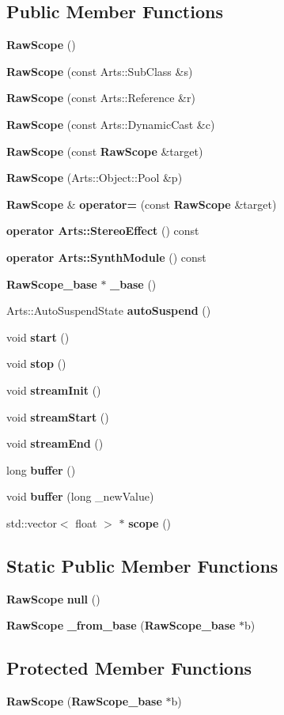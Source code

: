 \subsection*{Public Member Functions}
\begin{CompactItemize}
\item 
{\bf Raw\-Scope} ()
\item 
{\bf Raw\-Scope} (const Arts::Sub\-Class \&s)
\item 
{\bf Raw\-Scope} (const Arts::Reference \&r)
\item 
{\bf Raw\-Scope} (const Arts::Dynamic\-Cast \&c)
\item 
{\bf Raw\-Scope} (const {\bf Raw\-Scope} \&target)
\item 
{\bf Raw\-Scope} (Arts::Object::Pool \&p)
\item 
{\bf Raw\-Scope} \& {\bf operator=} (const {\bf Raw\-Scope} \&target)
\item 
{\bf operator Arts::Stereo\-Effect} () const 
\item 
{\bf operator Arts::Synth\-Module} () const 
\item 
{\bf Raw\-Scope\_\-base} $\ast$ {\bf \_\-base} ()
\item 
Arts::Auto\-Suspend\-State {\bf auto\-Suspend} ()
\item 
void {\bf start} ()
\item 
void {\bf stop} ()
\item 
void {\bf stream\-Init} ()
\item 
void {\bf stream\-Start} ()
\item 
void {\bf stream\-End} ()
\item 
long {\bf buffer} ()
\item 
void {\bf buffer} (long \_\-new\-Value)
\item 
std::vector$<$ float $>$ $\ast$ {\bf scope} ()
\end{CompactItemize}
\subsection*{Static Public Member Functions}
\begin{CompactItemize}
\item 
{\bf Raw\-Scope} {\bf null} ()
\item 
{\bf Raw\-Scope} {\bf \_\-from\_\-base} ({\bf Raw\-Scope\_\-base} $\ast$b)
\end{CompactItemize}
\subsection*{Protected Member Functions}
\begin{CompactItemize}
\item 
{\bf Raw\-Scope} ({\bf Raw\-Scope\_\-base} $\ast$b)
\end{CompactItemize}
